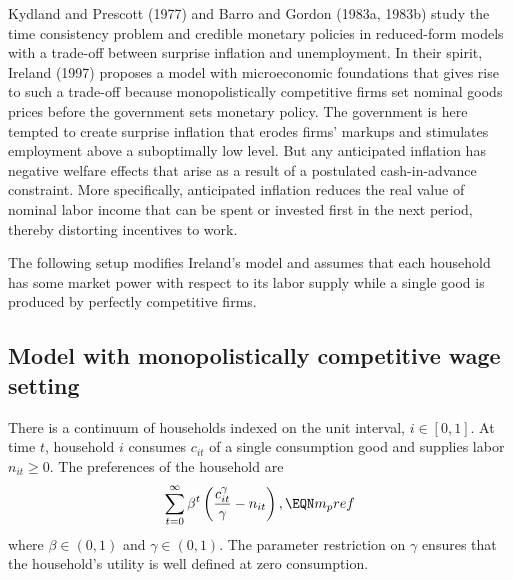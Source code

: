   
%
Kydland and
Prescott (1977) and Barro and Gordon (1983a, 1983b)
study the time consistency
problem and credible monetary policies in reduced-form models with a
trade-off between surprise inflation and unemployment. In their spirit,
Ireland (1997)
%
proposes a model with microeconomic foundations that gives
rise to such a trade-off because monopolistically competitive firms
set nominal goods prices before the government sets
monetary policy.
 The government is here tempted to create surprise inflation that erodes
firms' markups and stimulates employment above a suboptimally low level.
But any anticipated inflation has negative welfare effects that arise as
a result of a postulated cash-in-advance constraint. More specifically,
anticipated inflation reduces the real value of nominal labor income
that can be spent or invested first in the next period, thereby distorting
incentives to work.


The following setup modifies Ireland's model and assumes that each
household has some market power with respect to its labor supply while a
single good is produced by perfectly competitive firms.


\subsection{Model with monopolistically competitive wage setting}
There is a continuum of households indexed on the unit interval,
$i \in [0,1]$. At time $t$, household $i$ consumes $c_{it}$ of a
single consumption good and supplies labor $n_{it} \geq 0$.
 The
preferences of the household are
$$
\sum_{t=0}^\infty \beta^t \left( {c_{it}^\gamma \over \gamma} -n_{it}
                                                          \right), \EQN m_pref
$$
where $\beta \in (0,1)$ and $\gamma \in (0,1)$. The parameter restriction on
$\gamma$ ensures that the household's utility is well defined at zero
consumption.


